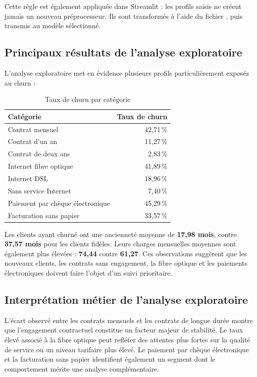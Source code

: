 \documentclass[12pt, a4paper]{article}
\newcommand{\filepath}[1]{\texttt{\detokenize{#1}}}
\begin{document}
Cette règle est également appliquée dans Streamlit : les profils saisis ne
créent jamais un nouveau préprocesseur. Ils sont transformés à l'aide du fichier
\filepath{models/preprocessor.pkl}, puis transmis au modèle sélectionné.

\subsection{Principaux résultats de l'analyse exploratoire}

L'analyse exploratoire met en évidence plusieurs profils particulièrement
exposés au churn :

\begin{table}[H]
\centering
\caption{Taux de churn par catégorie}
\begin{tabularx}{0.88\textwidth}{Xr}
\toprule
\textbf{Catégorie} & \textbf{Taux de churn}\\
\midrule
Contrat mensuel & 42,71\,\%\\
Contrat d'un an & 11,27\,\%\\
Contrat de deux ans & 2,83\,\%\\
Internet fibre optique & 41,89\,\%\\
Internet DSL & 18,96\,\%\\
Sans service Internet & 7,40\,\%\\
Paiement par chèque électronique & 45,29\,\%\\
Facturation sans papier & 33,57\,\%\\
\bottomrule
\end{tabularx}
\end{table}

Les clients ayant churné ont une ancienneté moyenne de \textbf{17,98 mois},
contre \textbf{37,57 mois} pour les clients fidèles. Leurs charges mensuelles
moyennes sont également plus élevées : \textbf{74,44} contre \textbf{61,27}.
Ces observations suggèrent que les nouveaux clients, les contrats sans
engagement, la fibre optique et les paiements électroniques doivent faire
l'objet d'un suivi prioritaire.

\subsection{Interprétation métier de l'analyse exploratoire}

L'écart observé entre les contrats mensuels et les contrats de longue durée
montre que l'engagement contractuel constitue un facteur majeur de stabilité.
Le taux élevé associé à la fibre optique peut refléter des attentes plus fortes
sur la qualité de service ou un niveau tarifaire plus élevé. Le paiement par
chèque électronique et la facturation sans papier identifient également un
segment dont le comportement mérite une analyse complémentaire.
\end{document}
